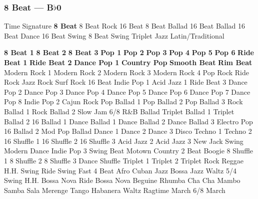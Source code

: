 \subsubsection[8 Beat]{8 Beat --- \UiKey{\II}\UiKey{\MET}B$\flat$0}
Time Signature
\textbf{8 Beat}
8 Beat Rock
16 Beat
8 Beat Ballad
16 Beat Ballad
16 Beat Dance
16 Beat Swing
8 Beat Swing
Triplet
Jazz
Latin/Traditional





























\textbf{8 Beat 1}
\textbf{8 Beat 2}
\textbf{8 Beat 3}
\textbf{Pop 1}
\textbf{Pop 2}
\textbf{Pop 3}
\textbf{Pop 4}
\textbf{Pop 5}
\textbf{Pop 6}
\textbf{Ride Beat 1}
\textbf{Ride Beat 2}
\textbf{Dance Pop 1}
\textbf{Country Pop}
\textbf{Smooth Beat}
\textbf{Rim Beat}
Modern Rock 1
Modern Rock 2
Modern Rock 3
Modern Rock 4
Pop Rock
Ride Rock
Jazz Rock
Surf Rock
16 Beat
Indie Pop 1
Acid Jazz 1
Ride Beat 3
Dance Pop 2
Dance Pop 3
Dance Pop 4
Dance Pop 5
Dance Pop 6
Dance Pop 7
Dance Pop 8
Indie Pop 2
Cajun Rock
Pop Ballad 1
Pop Ballad 2
Pop Ballad 3
Rock Ballad 1
Rock Ballad 2
Slow Jam
6/8 R\&B Ballad
Triplet Ballad 1
Triplet Ballad 2
16 Ballad 1
Dance Ballad 1
Dance Ballad 2
Dance Ballad 3
Electro Pop
16 Ballad 2
Mod Pop Ballad
Dance 1
Dance 2
Dance 3
Disco
Techno 1
Techno 2
16 Shuffle 1
16 Shuffle 2
16 Shuffle 3
Acid Jazz 2
Acid Jazz 3
New Jack Swing
Modern Dance
Indie Pop 3
Swing Beat
Motown
Country 2 Beat
Boogie
8 Shuffle 1
8 Shuffle 2
8 Shuffle 3
Dance Shuffle
Triplet 1
Triplet 2
Triplet Rock
Reggae
H.H. Swing
Ride Swing
Fast 4 Beat
Afro Cuban
Jazz Bossa
Jazz Waltz
5/4 Swing
H.H. Bossa Nova
Ride Bossa Nova
Beguine
Rhumba
Cha Cha
Mambo
Samba
Sala
Merenge
Tango
Habanera
Waltz
Ragtime
March
6/8 March
